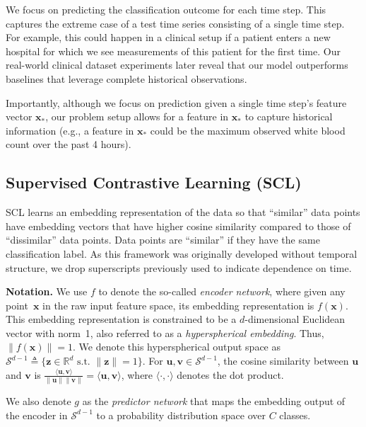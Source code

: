 \documentclass[pmlr,twocolumn,10pt]{jmlr} %
\begin{document}
We focus on predicting the classification outcome for each time step.
This captures the extreme case of a test time series consisting of a single time step. 
For example, this could happen in a clinical setup if a patient enters a new hospital for which we see measurements of this patient for the first time.
Our real-world clinical dataset experiments later reveal that our model outperforms baselines that leverage complete historical observations.

Importantly, although we focus on prediction given a single time step's feature vector $\mathbf{x}_*$, our problem setup allows for a feature in $\mathbf{x}_*$ to capture historical information (e.g., a feature in $\mathbf{x}_*$ could be the maximum observed white blood count over the past 4 hours).

\vspace{-1em}
\subsection{Supervised Contrastive Learning (SCL)}
\label{sec:supcon}
\vspace{-.25em}

SCL learns an embedding representation of the data so that ``similar'' data points have embedding vectors that have higher cosine similarity compared to those of ``dissimilar'' data points. Data points are ``similar'' if they have the same classification label. As this framework was originally developed without temporal structure, we drop superscripts previously used to indicate dependence on time.

\vspace{.2em}
\noindent
\textbf{Notation.}
We use $f$ to denote the so-called \emph{encoder network}, where given any point~$\mathbf{x}$ in the raw input feature space, its embedding representation is $f(\mathbf{x})$. This embedding representation is constrained to be a $d$-dimensional Euclidean vector with norm~1, also referred to as a \emph{hyperspherical embedding}. Thus, $\|f(\mathbf{x})\|=1$. We denote this hyperspherical output space as $\mathcal{S}^{d-1}\triangleq \{\mathbf{z}\in\mathbb{R}^d\text{ s.t.~}\|\mathbf{z}\|=1\}$. For $\mathbf{u},\mathbf{v}\in\mathcal{S}^{d-1}$, the cosine similarity between $\mathbf{u}$ and $\mathbf{v}$ is $\frac{\langle \mathbf{u}, \mathbf{v} \rangle}{\|\mathbf{u}\|\|\mathbf{v}\|} = \langle \mathbf{u}, \mathbf{v} \rangle$, where $\langle\cdot,\cdot\rangle$ denotes the dot product.

We also denote $g$ as the \emph{predictor network} that maps the embedding output of the encoder in $\mathcal{S}^{d-1}$ to a probability distribution space over $C$ classes.
\end{document}
